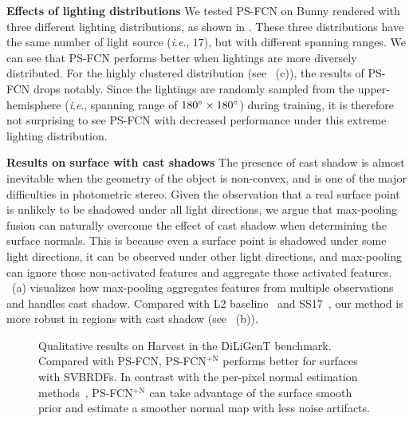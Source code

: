\documentclass[10pt,journal,compsoc]{IEEEtran}
\newcommand{\ie}{\textit{i}.\textit{e}.}
\newcommand{\rev}[1]{#1}
\renewcommand{\paragraph}[1]{\vspace{0.2em}\noindent \textbf{#1 \hspace{0.2em}}}
\begin{document}
\paragraph{Effects of lighting distributions} \rev{We tested PS-FCN on {\sc Bunny} rendered with three different lighting distributions, as shown in \Tref{tab:res_synth_mirco_baseline}. These three distributions have the same number of light source (\ie, $17$), but with different spanning ranges.
We can see that PS-FCN performs better when lightings are more diversely distributed. For the highly clustered distribution (see \Tref{tab:res_synth_mirco_baseline}~(c)), the results of PS-FCN drops notably. Since the lightings are randomly sampled from the upper-hemisphere (\ie, spanning range of $180\degree \times 180\degree$) during training, it is therefore not surprising to see PS-FCN with decreased performance under this extreme lighting distribution.
}

\paragraph{Results on surface with cast shadows} 
The presence of cast shadow is almost inevitable when the geometry of the object is non-convex, and is one of the major difficulties in photometric stereo.
Given the observation that a real surface point is unlikely to be shadowed under all light directions, we argue that max-pooling fusion can naturally overcome the effect of cast shadow when determining the surface normals.
This is because even a surface point is shadowed under some light directions, it can be observed under other light directions, and max-pooling can ignore those non-activated features and aggregate those activated features. 
~(a) visualizes how max-pooling aggregates features from multiple observations and handles cast shadow. Compared with L2 baseline~\cite{woodham1980ps} and SS17~\cite{santo2017deep}, our method is more robust in regions with cast shadow (see ~(b)).

\begin{figure}[t] \centering
     
    \caption{Qualitative results on {\sc Harvest} in the DiLiGenT benchmark. Compared with PS-FCN, PS-FCN$^{+\text{N}}$ performs better for surfaces with SVBRDFs. In contrast with the per-pixel normal estimation methods~\cite{ikehata2018cnn,hui2017shape,santo2017deep}, PS-FCN$^{+\text{N}}$ can take advantage of the surface smooth prior and estimate a smoother normal map with less noise artifacts.} \label{fig:res_harvest}
\end{figure}
\end{document}
